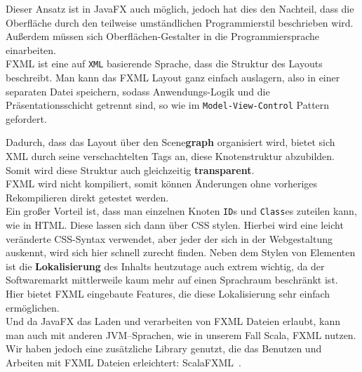 Dieser Ansatz ist in JavaFX auch möglich, jedoch hat dies den Nachteil, dass die Oberfläche durch den teilweise umständlichen Programmierstil beschrieben wird. Außerdem müssen sich Oberflächen-Gestalter in die Programmiersprache einarbeiten.\\
FXML ist eine auf \texttt{XML} basierende Sprache, dass die Struktur des Layouts beschreibt. Man kann das FXML Layout ganz einfach auslagern, also in einer separaten Datei speichern, sodass Anwendungs-Logik und die Präsentationsschicht getrennt sind, so wie im \texttt{Model-View-Control} Pattern gefordert.

Dadurch, dass das Layout über den Scene\textbf{graph} organisiert wird, bietet sich XML durch seine verschachtelten Tags an, diese Knotenstruktur abzubilden. Somit wird diese Struktur auch gleichzeitig \textbf{transparent}.\\
FXML wird nicht kompiliert, somit können Änderungen ohne vorheriges Rekompilieren direkt getestet werden.\\
Ein großer Vorteil ist, dass man einzelnen Knoten \texttt{ID}s und \texttt{Class}es zuteilen kann, wie in HTML. Diese lassen sich dann über CSS stylen. Hierbei wird eine leicht veränderte CSS-Syntax verwendet, aber jeder der sich in der Webgestaltung auskennt, wird sich hier schnell zurecht finden. Neben dem Stylen von Elementen ist die \textbf{Lokalisierung} des Inhalts heutzutage auch extrem wichtig, da der Softwaremarkt mittlerweile kaum mehr auf einen Sprachraum beschränkt ist. Hier bietet FXML eingebaute Features, die diese Lokalisierung sehr einfach ermöglichen.\\
Und da JavaFX das Laden und verarbeiten von FXML Dateien erlaubt, kann man auch mit anderen JVM--Sprachen, wie in unserem Fall Scala, FXML nutzen. Wir haben jedoch eine zusätzliche Library genutzt, die das Benutzen und Arbeiten mit FXML Dateien erleichtert: ScalaFXML~\cite{ScalaFXML}.

